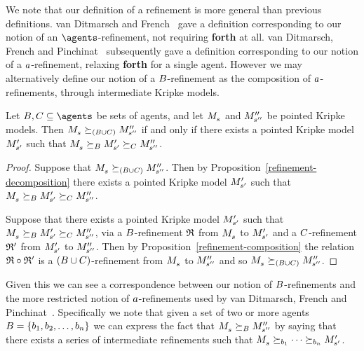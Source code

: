 We note that our definition of a refinement is more general than previous definitions.
van Ditmarsch and French~\cite{vanditmarsch:2009} gave a definition corresponding to our notion of an $\agents$-refinement, not requiring {\bf forth} at all.
van Ditmarsch, French and Pinchinat~\cite{vanditmarsch:2010} subsequently gave a definition corresponding to our notion of a $a$-refinement, relaxing {\bf forth} for a single agent.
However we may alternatively define our notion of a $B$-refinement as the composition of $a$-refinements, through intermediate Kripke models.

\begin{proposition}\label{refinement-agent-decomposition}
Let $\agentsB, \agentsC \subseteq \agents$ be sets of agents, and let $\kPModel{\kStateS}$ and ${M^{\prime\prime}_{{s}^{\prime\prime}}}$ be pointed Kripke models.
Then $\kPModel{\kStateS} \simulates[(\agentsB \cup \agentsC)] \kPModelPP{\kStateSPP}$ if and only if there exists a pointed Kripke model ${M^{\prime}_{{s}^{\prime}}}$ such that $\kPModel{\kStateS} \simulatesBs \kPModelP{\kStateSP} \simulatesCs \kPModelPP{\kStateSPP}$.
\end{proposition}

\begin{proof}
Suppose that $\kPModel{\kStateS} \simulates[(\agentsB \cup \agentsC)] \kPModelPP{\kStateSPP}$.
Then by Proposition~\ref{refinement-decomposition} there exists a pointed Kripke model ${M^{\prime}_{{s}^{\prime}}}$ such that $\kPModel{\kStateS} \simulatesBs \kPModelP{\kStateSP} \simulatesCs \kPModelPP{\kStateSPP}$.

Suppose that there exists a pointed Kripke model ${M^{\prime}_{{s}^{\prime}}}$ such that $\kPModel{\kStateS} \simulatesBs \kPModelP{\kStateSP} \simulatesCs \kPModelPP{\kStateSPP}$, via a $B$-refinement $\mathfrak{R}$ from $\kPModel{\kStateS}$ to ${M^{\prime}_{{s}^{\prime}}}$ and a $C$-refinement $\mathfrak{R}'$ from ${M^{\prime}_{{s}^{\prime}}}$ to ${M^{\prime\prime}_{{s}^{\prime\prime}}}$.
Then by Proposition~\ref{refinement-composition} the relation $\mathfrak{R} \circ \mathfrak{R}'$ is a $(B \cup C)$-refinement from $\kPModel{\kStateS}$ to ${M^{\prime\prime}_{{s}^{\prime\prime}}}$ and so $\kPModel{\kStateS} \simulates[(\agentsB \cup \agentsC)] \kPModelPP{\kStateSPP}$.
\end{proof}

Given this we can see a correspondence between our notion of $B$-refinements and the more restricted notion of $a$-refinements used by van Ditmarsch, French and Pinchinat~\cite{vanditmarsch:2010}.
Specifically we note that given a set of two or more agents $B = \{b_1, b_2, \dots, b_n\}$ we can express the fact that $\kPModel{\kStateS} \simulatesBs \kPModelPP{\kStateSPP}$ by saying that there exists a series of intermediate refinements such that $\kPModel{\kStateS} \simulates[\agentB_1] \cdots \simulates[\agentB_n] \kPModelP{\kStateSP}$.

